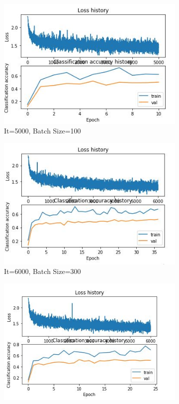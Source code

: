 \documentclass[
	12pt, %
]{fphw}
\begin{document}
\begin{figure}[h!]
\begin{subfigure}[b]{0.2\textwidth}
         \includegraphics[width=\textwidth]{img/Img_8.JPG}
         \caption{It=5000, Batch Size=100}
     \end{subfigure}
     \hfill
     \begin{subfigure}[b]{0.2\textwidth}
         \centering
         \includegraphics[width=\textwidth]{img/Img_9.JPG}
         \caption{It=6000, Batch Size=300}
     \end{subfigure}
     \hfill
     \begin{subfigure}[b]{0.2\textwidth}
         \centering
         \includegraphics[width=\textwidth]{img/Img_10.JPG}

\end{subfigure}
\end{figure}
\end{document}
